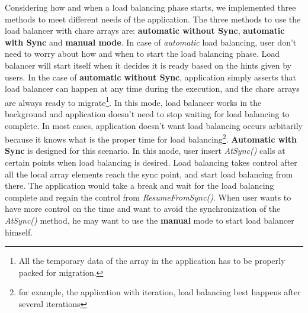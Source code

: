 Considering how and when a load balancing phase starts, we implemented three
methods to meet different needs of the application.
The three methods to use the load balancer with chare arrays are:
{\bf automatic without Sync}, {\bf automatic with Sync} and {\bf manual mode}.
In case of {\em automatic} load balancing, user don't need to worry about 
how and when to start the load balancing phase. Load balancer will start 
itself when it decides it is ready based on the hints given by users.
In the case of {\bf automatic without Sync}, application simply asserts
that load balancer can happen at any time during the execution, and 
the chare arrays are always ready to migrate\footnote{All the temporary 
data of the array in the application has to be properly packed for 
migration.}. 
In this mode, load balancer works in the background and application 
doesn't need to stop waiting for load balancing to complete. In most cases, 
application doesn't want load balancing occurs arbitarily because it knows 
what is the proper time for load balancing\footnote{for example, the 
application with iteration, load balancing best happens after several 
iterations}. {\bf Automatic with Sync} is designed for this scenario. 
In this mode, user insert {\em AtSync()} calls at certain points when load 
balancing is desired. Load balancing takes control after all the 
local array elements reach the sync point, and start load balancing 
from there. The application would take a break and wait for the load 
balancing complete and regain the control from {\em ResumeFromSync()}.
When user wants to have more control on the time and want to avoid
the synchronization of the {\em AtSync()} method, he may want to use 
the {\bf manual} mode to start load balancer himself.

